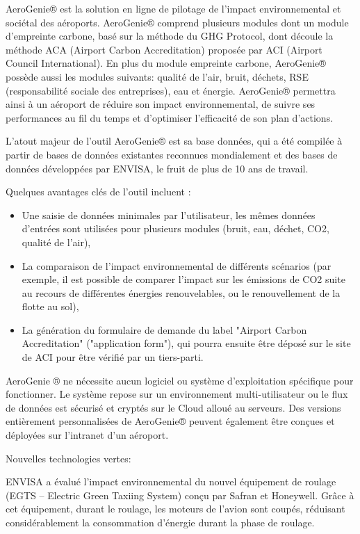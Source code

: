 \documentclass[a4paper,12pt,twoside]{article}
\begin{document}
    AeroGenie® est la solution en ligne de pilotage de l'impact environnemental et sociétal des aéroports. AeroGenie® comprend plusieurs modules dont un module d'empreinte carbone, basé sur la méthode du GHG Protocol, dont découle la méthode ACA (Airport Carbon Accreditation) proposée par ACI (Airport Council International). En plus du module empreinte carbone, AeroGenie® possède aussi les modules suivants: qualité de l'air, bruit, déchets, RSE (responsabilité sociale des entreprises), eau et énergie. AeroGenie® permettra ainsi à un aéroport de réduire son impact environnemental, de suivre ses performances au fil du temps et d'optimiser l'efficacité de son plan d'actions.
    
    L'atout majeur de l'outil AeroGenie® est sa base données, qui a été compilée à partir de bases de données existantes reconnues mondialement et des bases de données développées par ENVISA, le fruit de plus de 10 ans de travail.
    
    Quelques avantages clés de l'outil incluent :
    \begin{itemize}
    	\item Une saisie de données minimales par l'utilisateur, les mêmes données d'entrées sont utilisées pour plusieurs modules (bruit, eau, déchet, CO2, qualité de l'air),
    	\item La comparaison de l'impact environnemental de différents scénarios (par exemple, il est possible de comparer l'impact sur les émissions de CO2 suite au recours de différentes énergies renouvelables, ou le renouvellement de la flotte au sol),
    	\item La génération du formulaire de demande du label "Airport Carbon Accreditation" ("application form"), qui pourra ensuite être déposé sur le site de ACI pour être vérifié par un tiers-parti.
    \end{itemize}
    AeroGenie ® ne nécessite aucun logiciel ou système d'exploitation spécifique pour fonctionner.  Le système repose sur un environnement multi-utilisateur ou le flux de données est sécurisé et cryptés sur le Cloud alloué au serveurs. Des versions entièrement personnalisées de AeroGenie® peuvent également être conçues et déployées sur l'intranet d'un aéroport.
    
    Nouvelles technologies vertes:
    
    ENVISA a évalué l'impact environnemental du nouvel équipement de roulage (EGTS – Electric Green Taxiing System) conçu par Safran et Honeywell. Grâce à cet équipement, durant le roulage, les moteurs de l'avion sont coupés, réduisant considérablement la consommation d'énergie durant la phase de roulage.
   
\end{document}
